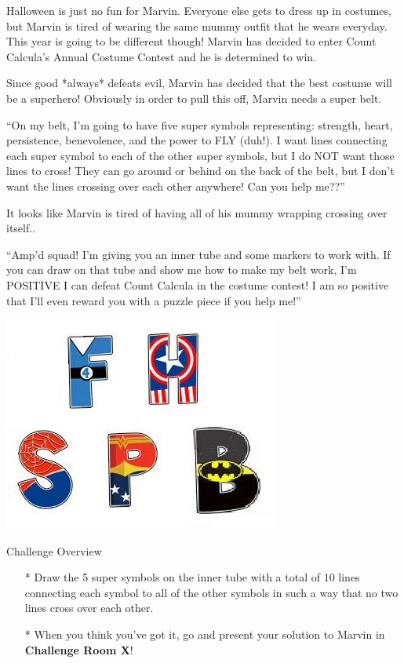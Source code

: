 

Halloween is just no fun for Marvin. Everyone else gets to dress up in costumes, but Marvin is tired of wearing the same mummy outfit that he wears everyday. This year is going to be different though! Marvin has decided to enter Count Calcula's Annual Costume Contest and he is determined to win.

Since good *always* defeats evil, Marvin has decided that the best costume will be a superhero! Obviously in order to pull this off, Marvin needs a super belt.

``On my belt, I'm going to have five super symbols representing: strength, heart, persistence, benevolence, and the power to FLY (duh!). I want lines connecting each super symbol to each of the other super symbols, but I do NOT want those lines to cross! They can go around or behind on the back of the belt, but I don't want the lines crossing over each other anywhere! Can you help me??''

It looks like Marvin is tired of having all of his mummy wrapping crossing over itself..

``Amp'd squad! I'm giving you an inner tube and some markers to work with. If you can draw on that tube and show me how to make my belt work, I'm POSITIVE I can defeat Count Calcula in the costume contest! I am so positive that I'll even reward you with a puzzle piece if you help me!''

    \includegraphics{assets/kat/alpha1}


Challenge Overview
\begin{itemize}
\item[*] Draw the 5 super symbols on the inner tube with a total of 10 lines connecting each symbol to all of the other symbols in such a way that no two lines cross over each other.

\item[*] When you think you've got it, go and present your solution to Marvin in \textbf{Challenge Room X}!
\end{itemize}
